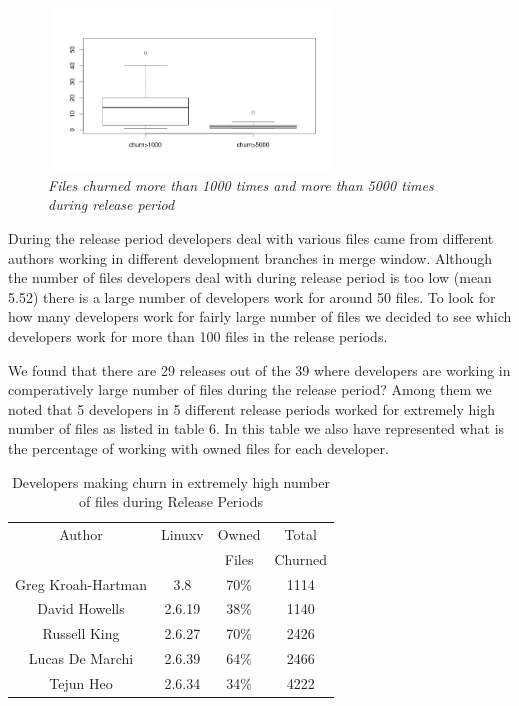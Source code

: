 \documentclass{acm_proc_article-sp}
\begin{document}
\begin{figure}
\begin{center}
\includegraphics[height=1.7in,width=3in]{fileChurnRPExp1000vs5000box.png}
\caption{\small \sl Files churned more than 1000 times and more than 5000 times during release period}
\end{center}
\end{figure}

During the release period developers deal with various files came from different authors working in different development branches in merge window. Although the number of files developers deal with during release period is too low (mean 5.52) there is a large number of developers work for around 50 files. To look for how many developers work for fairly large number of files we decided to see which developers work for more than 100 files in the release periods.

We found that there are 29 releases out of the 39 where developers are working in comperatively large number of files during the release period? Among them we noted that 5 developers in 5 different release periods worked for extremely high number of files as listed in table 6. In this table we also have represented what is the percentage of working with owned files for each developer.

\begin{table}[ht]
\caption{Developers making churn in extremely high number of files during Release Periods}  %
\centering 						%
\begin{tabular}{c c c c}				%
\hline\hline						%
Author 						& Linuxv		& Owned 			& Total \\
							& 			& Files				& Churned \\ [1ex]
\hline 							%
Greg Kroah-Hartman			& 3.8		& 70\%				& 1114\\
David Howells				& 2.6.19		& 38\%				& 1140\\
Russell King					& 2.6.27		& 70\%				& 2426\\
Lucas De Marchi				& 2.6.39		& 64\% 				& 2466\\
Tejun Heo					& 2.6.34		& 34\% 				& 4222\\
[1ex]							%
\hline 							%
\end{tabular}
\label{table:nonlin} 				%
\end{table}
\end{document}
